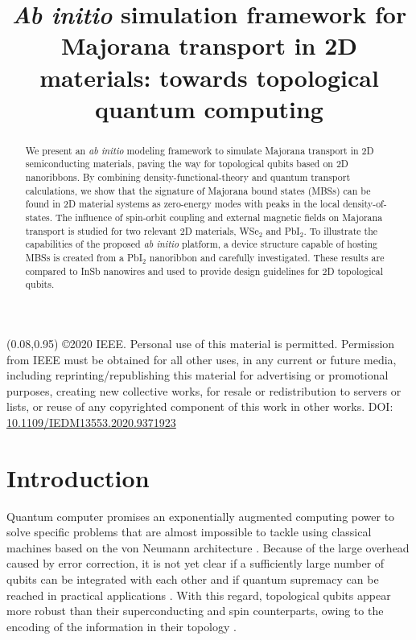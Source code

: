 \documentclass[10pt,usletter,conference]{IEEEtran}
\newcommand{\copyrightstatement}{
    \begin{textblock}{0.84}(0.08,0.95)    %
         \noindent
         \footnotesize
         \copyright 2020 IEEE. Personal use of this material is permitted. Permission from IEEE must be obtained for all other uses, in any current or future media, including reprinting/republishing this material for advertising or promotional purposes, creating new collective works, for resale or redistribution to servers or lists, or reuse of any copyrighted component of this work in other works.
         DOI: \href{https://ieeexplore.ieee.org/abstract/document/9371923}{10.1109/IEDM13553.2020.9371923}
    \end{textblock}
}
\begin{document}
\copyrightstatement

\title{\huge \textit{Ab initio} simulation framework for Majorana
  transport in 2D materials: towards topological quantum computing}

\author{
}

\maketitle


\begin{abstract}
  We present an \textit{ab initio} modeling framework to simulate
  Majorana transport in 2D semiconducting materials, paving the way
  for topological qubits based on 2D nanoribbons. By combining
  density-functional-theory and quantum transport calculations, we
  show that the signature of Majorana bound states (MBSs) can be found
  in 2D material systems as zero-energy modes with peaks in the local
  density-of-states. The influence of spin-orbit coupling and external
  magnetic fields on Majorana transport is studied for two relevant 2D
  materials, WSe$_2$ and PbI$_2$. To illustrate the capabilities of
  the proposed \textit{ab initio} platform, a device structure capable
  of hosting MBSs is created from a PbI$_2$ nanoribbon and carefully
  investigated. These results are compared to InSb nanowires and used
  to provide design guidelines for 2D topological qubits.
\end{abstract}


\section{Introduction}
\par Quantum computer promises an exponentially augmented computing
power to solve specific problems that are almost impossible to tackle
using classical machines based on the von Neumann architecture
\cite{Feynman}. Because of the large overhead caused by error
correction, it is not yet clear if a sufficiently large number 
of qubits can be integrated with each other and if quantum supremacy
can be reached in practical applications \cite{Google}. With this
regard, topological qubits appear more robust than their
superconducting and spin counterparts, owing to the encoding of the
information in their topology \cite{Raussendorf}.
\end{document}
